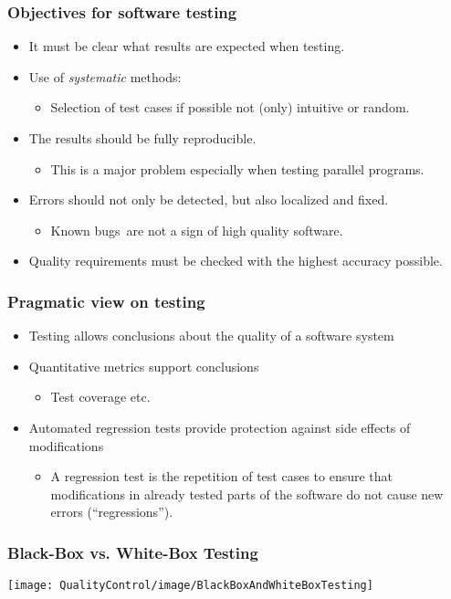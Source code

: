 \begin{frame}
\frametitle{Objectives for software testing}
\begin{itemize}
  \item It must be clear what results are expected when testing.
  \item Use of \emph{systematic} methods:
    \begin{itemize}
      \item Selection of test cases if possible not (only) intuitive or random.
    \end{itemize}
  \item The results should be fully reproducible. 
    \begin{itemize}
      \item This is a major problem especially when testing parallel programs.
    \end{itemize}
  \item Errors should not only be detected, but also localized and fixed. %
    \begin{itemize}
      \item \glq Known bugs\grq\ are not a sign of high quality software.
    \end{itemize}       
  \item Quality requirements must be checked with the highest accuracy possible.
\end{itemize}
\end{frame}


\begin{frame}
\frametitle{Pragmatic view on testing}
\begin{itemize}
    \item Testing allows conclusions about the quality of a software system 
    \item Quantitative metrics support conclusions 
         \begin{itemize}\item Test coverage etc. 
         \end{itemize} 
    \item Automated regression tests provide protection against side effects of modifications 
		\begin{itemize}
			\item A regression test is the repetition of test cases to ensure that modifications in already tested parts of the software do not cause new errors (``regressions''). 
		\end{itemize}
\end{itemize}
\end{frame}


\begin{frame}
\frametitle{Black-Box vs. White-Box Testing}
  \begin{center}
  \texttt{[image: QualityControl/image/BlackBoxAndWhiteBoxTesting]}
  \end{center}
\end{frame}

